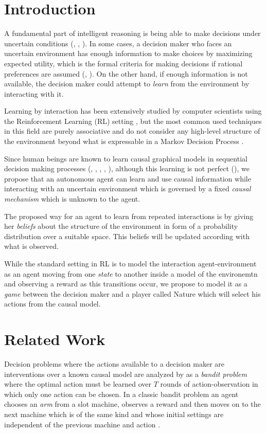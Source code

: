 \documentclass{article}
\begin{document}
\section{Introduction}
A fundamental part of intelligent reasoning is being able to make decisions under uncertain conditions (\cite{lake2017building}, \cite{danks2014unifying}, \cite{pearlwhy}). In some cases, a decision maker who faces an uncertain environment has enough information to make choices by maximizing expected utility, which is the formal criteria for making decisions if rational preferences are assumed (\cite{bernardo2000bayesian}, \cite{gilboa2009decision}). On the other hand, if enough information is not available, the decision maker could attempt to \textit{learn} from the environment by interacting with it.

Learning by interaction has been extensively studied by computer scientists using the Reinforcement Learning (RL) setting \cite{sutton1998reinforcement}, but the most common used techniques  in this field are purely associative and do not consider any high-level structure of the environment beyond what is expressable in a Markov Decision Process \cite{garnelo2016towards}.

Since human beings are known to learn causal graphical models in sequential decision making processes (\cite{sloman2006causal}, \cite{nichols2007decision}, \cite{meder2010observing}, \cite{hagmayer2013repeated}, \cite{danks2014unifying}), although this learning is not perfect (\cite{rottman2014reasoning}), we propose that an autonomous agent can learn and use causal information while interacting with an uncertain environment which is governed by a fixed \textit{causal mechanism} which is unknown to the agent.  

The proposed way for an agent to learn from repeated interactions is by giving her \textit{beliefs} about the structure of the environment in form of a probability distribution over a suitable space. This beliefs will be updated according with what is observed.

While the standard setting in RL is to model the interaction agent-environment as an agent moving from one \textit{state} to another inside a model of the environemtn and observing a reward as this transitions occur, we propose to model it as a \textit{game} between the decision maker and a player called Nature which will select his actions from the causal model.

\section{Related Work}
Decision problems where the actions available to a decision maker are interventions over a known causal model are analyzed by \cite{lattimoreNIPS2016} as a \textit{bandit problem} where the optimal action must be learned over $T$ rounds of action-observation in which only one action can be chosen. In a classic bandit problem an agent chooses an \textit{arm} from a slot machine, observes a reward and then moves on to the next machine which is of the same kind and whose initial settings are independent of the previous machine and action \cite{sutton1998reinforcement}.
\end{document}
